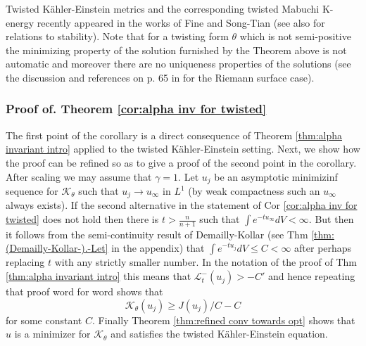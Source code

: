 \documentclass[11pt,oneside,english]{amsart}
\numberwithin{equation}{section}
\numberwithin{figure}{section}
\theoremstyle{plain}
\theoremstyle{plain}
\theoremstyle{plain}
\theoremstyle{plain}
\theoremstyle{remark}
\theoremstyle{definition}
\begin{document}
Twisted Kähler-Einstein metrics and the corresponding twisted Mabuchi
K-energy recently appeared in the works of Fine \cite{fine} and Song-Tian
\cite{s-t} (see also \cite{st} for relations to stability). Note
that for a twisting form $\theta$ which is not semi-positive the
minimizing property of the solution furnished by the Theorem above
is not automatic and moreover there are no uniqueness properties of
the solutions (see the discussion and references on p. 65 in \cite{ta}
for the Riemann surface case).

\subsubsection{Proof of. Theorem \ref{cor:alpha inv for twisted}}

The first point of the corollary is a direct consequence of Theorem
\ref{thm:alpha invariant intro} applied to the twisted Kähler-Einstein
setting. Next, we show how the proof can be refined so as to give
a proof of the second point in the corollary. After scaling we may
assume that $\gamma=1.$ Let $u_{j}$ be an asymptotic minimizinf
sequence for $\mathcal{K}_{\theta}$ such that $u_{j}\rightarrow u_{\infty}$
in $L^{1}$ (by weak compactness such an $u_{\infty}$ always exists).
If the second alternative in the statement of Cor \ref{cor:alpha inv for twisted}
does not hold then there is $t>\frac{n}{n+1}$ such that $\int e^{-tu_{\infty}}dV<\infty.$
But then it follows from the semi-continuity result of Demailly-Kollar
\cite{d-j} (see Thm \ref{thm:(Demailly-Kollar-).-Let} in the appendix)
that $\int e^{-tu_{j}}dV\leq C<\infty$ after perhaps replacing $t$
with any strictly smaller number. In the notation of the proof of
Thm \ref{thm:alpha invariant intro} this means that $\mathcal{L}_{t}^{-}(u_{j})>-C'$
and hence repeating that proof word for word shows that 
\begin{equation}
\mathcal{K}_{\theta}(u_{j})\geq J(u_{j})/C-C\label{eq:proof of cor nadel}
\end{equation}
 for some constant $C.$ Finally Theorem \ref{thm:refined conv towards opt}
shows that $u$ is a minimizer for $\mathcal{K}_{\theta}$ and satisfies
the twisted Kähler-Einstein equation. 
\end{document}
